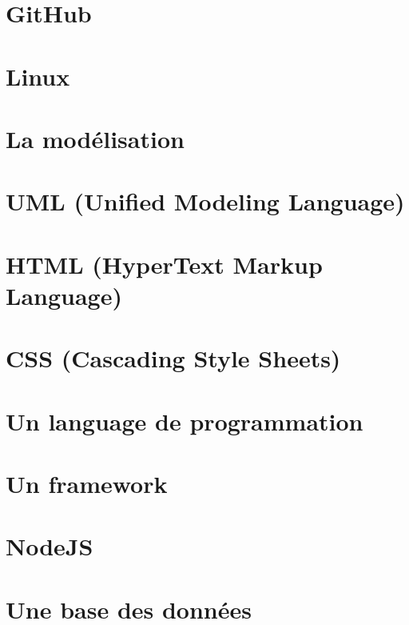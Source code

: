 \section{GitHub}\label{sec:github-1}


\section{Linux}\label{sec:linux}


\section{La modélisation}\label{sec:modelisation}


\section{UML (Unified Modeling Language)}\label{sec:uml}


\section{HTML (HyperText Markup Language)}\label{sec:html}


\section{CSS (Cascading Style Sheets)}\label{sec:css}


\section{Un language de programmation}\label{sec:language-de-programmation}


\section{Un framework}\label{sec:framework}


\section{NodeJS}\label{sec:nodejs}


\section{Une base des données}\label{sec:base-de-donnees}


